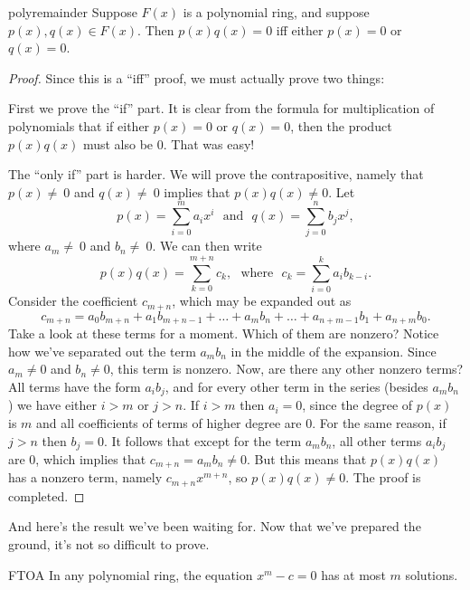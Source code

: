 \begin {prop}{polyremainder}
Suppose $F(x)$ is a polynomial ring, and suppose $p(x),  q(x) \in F(x)$. Then $p(x)  q(x)=0$ iff either $p(x)=0$ or $q(x)=0$.
\end {prop}
\begin {proof}
Since this is a ``iff'' proof, we must actually prove two things:  

First we prove the ``if'' part.  It is clear from the formula for multiplication of polynomials that if either $p(x)=0$ or $q(x)=0$, then the product $p(x)q(x)$ must also be 0. That was easy!

The ``only if'' part is harder. We will prove the contrapositive, namely that  $p(x)\neq\ 0$ and  $ q(x)\neq\ 0$ implies that  $p(x)q(x) \neq 0$.
Let 
\[p(x) =  \sum_{i=0}^{m} a_i x^i \text{~~and~~} q(x) =  \sum_{j=0}^{n} b_j x^j,\] 
where $a_m \neq\ 0$ and $b_n\neq\ 0$.
We can then write
 \[p(x) q(x) = \sum_{k=0}^{m+n} c_k, \text{~~where~~} c_{k} =  \sum_{i=0}^{k}a_i b_{k-i}.\]
Consider the coefficient $c_{m+n}$, which may be expanded out as
\[
c_{m+n} =  a_0 b_{m+n} + a_1 b_{m+n-1} + \ldots  + a_{m}b_{n} + \dots +  a_{n+m-1}b_{1} + a_{n+m}b_{0}.
\]
Take a look at these terms for a moment. Which of them are nonzero?  Notice how we've separated out the term $a_{m}b_{n}$ in the middle of the expansion. Since $a_{m} \neq 0$ and $b_{n} \neq 0$, this term is nonzero. Now, are there
any other nonzero terms?  All terms have the  form $a_i b_j$, and for every other term in the series (besides $a_{m}b_{n}$) we have either $i>m$ or $j>n$.  If $i>m$ then $a_i=0$, since the degree of $p(x)$ is $m$ and all coefficients of terms of higher degree are 0.  For the same reason, if $j>n$ then $b_j=0$. It follows that except for the term $a_{m}b_{n}$, all other terms $a_ib_j$ are 0, which implies that $c_{m+n} = a_mb_n \neq 0$. But this means that $p(x)q(x)$ has a nonzero term, namely
$c_{m+n}x^{m+n}$, so $p(x)q(x) \neq 0$.    The proof is completed.
\end{proof}

And here's the result we've been waiting for. Now that we've prepared the ground, it's not so difficult to prove.

\begin {prop}{FTOA}
In any polynomial ring, the equation $x^m-c=0$ has at most $m$ solutions.
\end {prop}


